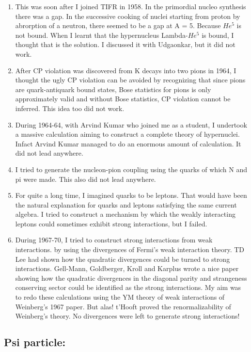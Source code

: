 \begin{enumerate}
\item This was soon after I joined TIFR in 1958. In the primordial nucleo 
synthesis there was a gap. In the successive cooking of nuclei starting 
from proton by abrorption of a neutron, there seemed to be a gap at A = 
5. Because $He^5$ is not bound. When I learnt that the hypernucleus 
Lambda-$He^5$ is bound, I thought that is the solution. I discussed it 
with Udgaonkar, but it did not work.
\item After CP violation was discovered from K decays into two pions in 
1964, I thought the ugly CP violation can be avoided by recognizing that 
since pions are quark-antiquark bound states, Bose statistics for pions 
is only approximately valid and without Bose statistics, CP violation 
cannot be inferred. This idea too did not work.
\item During 1964-64, with Arvind Kumar who joined me as a student, I 
undertook a massive calculation aiming to construct a complete theory of 
hypernuclei. Infact Arvind Kumar managed to do an enormous amount of 
calculation. It did not lead anywhere.
\item I tried to generate the nucleon-pion coupling using the quarks of 
which N and pi were made. This also did not lead anywhere.
\item For quite a long time, I imagined quarks to be leptons. That would have 
been the natural explanation for quarks and leptons satisfying the same 
current algebra. I tried to construct a mechanism by which the weakly 
interacting leptons could sometimes exhibit strong interactions, but I 
failed.
\item During 1967-70, I tried to construct strong interactions from weak 
interactions. by using the divergences of Fermi's weak interaction 
theory. TD Lee had shown how the quadratic divergences could be turned 
to strong interactions. Gell-Mann, Goldberger, Kroll and Karplus wrote a 
nice paper showing how the quadratic divergences in the diagonal parity 
and strangeness conserving sector could be identified as the strong 
interactions. My aim was to redo these calculations using the YM theory 
of weak interactions of Weinberg's 1967 paper. But alas! t'Hooft proved 
the renormalizability of Weinberg's theory. No divergences were left to 
generate strong interactions!
\end{enumerate}

\subsection*{Psi particle: }

